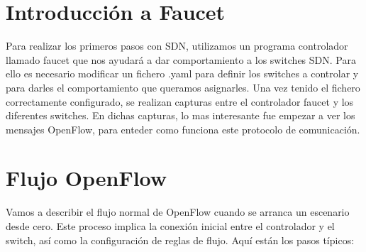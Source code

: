 \documentclass[a4paper, 12pt]{book}
\begin{document}
	\section{Introducción a Faucet}
	Para realizar los primeros pasos con SDN, utilizamos un programa controlador llamado faucet que nos ayudará a dar comportamiento a los switches SDN. Para ello es necesario modificar un fichero .yaml para definir los switches a controlar y para darles el comportamiento que queramos asignarles.
	Una vez tenido el fichero correctamente configurado, se realizan capturas entre el controlador faucet y los diferentes switches.
	En dichas capturas, lo mas interesante fue empezar a ver los mensajes OpenFlow, para enteder como funciona este protocolo de comunicación.
	
	\section{Flujo OpenFlow}
	Vamos a describir el flujo normal de OpenFlow cuando se arranca un escenario desde cero. Este proceso implica la conexión inicial entre el controlador y el switch, así como la configuración de reglas de flujo. Aquí están los pasos típicos:
	
\end{document}
